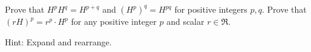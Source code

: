 
\begin{Exercise}[
name={},
title={}, 
difficulty=0,
origin={\cite{JH}}]
\Question Prove that $H^pH^q=H^{p+q}$ and $(H^p)^q=H^{pq}$ 
        for positive integers \( p,q \).
\Question Prove that $(rH)^p=r^p\cdot H^p$ 
        for any positive integer \( p \) and scalar \( r\in\Re \).
\end{Exercise}

\begin{Answer}
Hint: Expand and rearrange.
\end{Answer}
